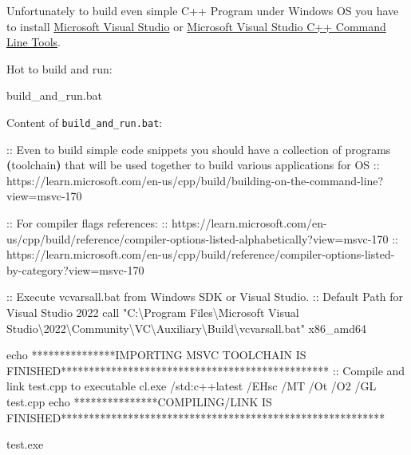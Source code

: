 \documentclass[
]{article}
\newenvironment{Shaded}{}{}
\newcommand{\BuiltInTok}[1]{#1}
\newcommand{\ErrorTok}[1]{\textcolor[rgb]{1.00,0.00,0.00}{\textbf{#1}}}
\newcommand{\ExtensionTok}[1]{#1}
\newcommand{\KeywordTok}[1]{\textcolor[rgb]{0.00,0.44,0.13}{\textbf{#1}}}
\newcommand{\NormalTok}[1]{#1}
\newcommand{\PreprocessorTok}[1]{\textcolor[rgb]{0.74,0.48,0.00}{#1}}
\newcommand{\StringTok}[1]{\textcolor[rgb]{0.25,0.44,0.63}{#1}}
\begin{document}
Unfortunately to build even simple C++ Program under Windows OS you have
to install \href{https://visualstudio.microsoft.com/}{Microsoft Visual
Studio} or
\href{https://learn.microsoft.com/en-us/cpp/build/vscpp-step-0-installation?view=msvc-170}{Microsoft
Visual Studio C++ Command Line Tools}.

Hot to build and run:

\begin{Shaded}
\begin{Highlighting}[]
\ExtensionTok{build\_and\_run.bat}
\end{Highlighting}
\end{Shaded}

Content of \texttt{build\_and\_run.bat}:

\begin{Shaded}
\begin{Highlighting}[]
\ExtensionTok{::}\NormalTok{ Even to build simple code snippets you should have a collection of programs }\ErrorTok{(}\ExtensionTok{toolchain}\KeywordTok{)} \ExtensionTok{that}\NormalTok{ will be used together to build various applications for OS}
\ExtensionTok{::}\NormalTok{  https://learn.microsoft.com/en{-}us/cpp/build/building{-}on{-}the{-}command{-}line}\PreprocessorTok{?}\NormalTok{view=msvc{-}170}

\ExtensionTok{::}\NormalTok{ For compiler flags references:}
\ExtensionTok{::}\NormalTok{   https://learn.microsoft.com/en{-}us/cpp/build/reference/compiler{-}options{-}listed{-}alphabetically}\PreprocessorTok{?}\NormalTok{view=msvc{-}170}
\ExtensionTok{::}\NormalTok{   https://learn.microsoft.com/en{-}us/cpp/build/reference/compiler{-}options{-}listed{-}by{-}category}\PreprocessorTok{?}\NormalTok{view=msvc{-}170}

\ExtensionTok{::}\NormalTok{ Execute vcvarsall.bat from Windows SDK or Visual Studio. }
\ExtensionTok{::}\NormalTok{ Default Path for Visual Studio 2022}
\ExtensionTok{call} \StringTok{"C:\textbackslash{}Program Files\textbackslash{}Microsoft Visual Studio\textbackslash{}2022\textbackslash{}Community\textbackslash{}VC\textbackslash{}Auxiliary\textbackslash{}Build\textbackslash{}vcvarsall.bat"}\NormalTok{ x86\_amd64}

\BuiltInTok{echo} \PreprocessorTok{***************}\NormalTok{IMPORTING MSVC TOOLCHAIN IS FINISHED}\PreprocessorTok{************************************************}
\ExtensionTok{::}\NormalTok{ Compile and link test.cpp to executable}
\ExtensionTok{cl.exe}\NormalTok{ /std:c++latest /EHsc /MT /Ot /O2 /GL test.cpp}
\BuiltInTok{echo} \PreprocessorTok{***************}\NormalTok{COMPILING/LINK IS FINISHED}\PreprocessorTok{**********************************************************}

\ExtensionTok{test.exe}
\end{Highlighting}
\end{Shaded}
\end{document}

